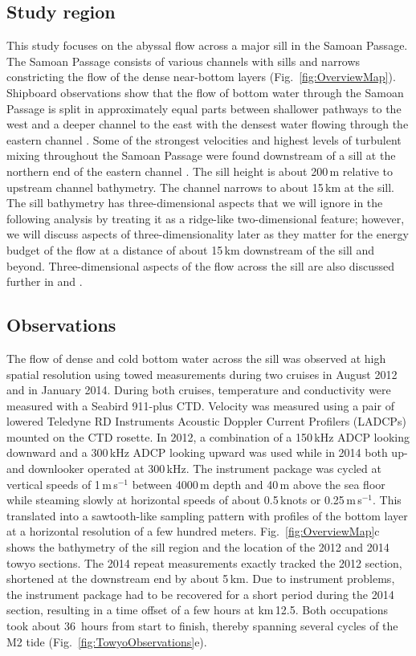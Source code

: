 \documentclass{ametsocV6.1}
\begin{document}
\subsection{Study region}\label{sec:StudyRegion}
This study focuses on the abyssal flow across a major sill in the Samoan Passage.
The Samoan Passage consists of various channels with sills and narrows constricting the flow of the dense near-bottom layers (Fig.~\ref{fig:OverviewMap}).
Shipboard observations show that the flow of bottom water through the Samoan Passage is split in approximately equal parts between shallower pathways to the west and a deeper channel to the east with the densest water flowing through the eastern channel \citep{voetetal15}.
Some of the strongest velocities and highest levels of turbulent mixing throughout the Samoan Passage were found downstream of a sill at the northern end of the eastern channel \citep{alfordetal13c}.
The sill height is about 200\,m relative to upstream channel bathymetry.
The channel narrows to about 15\,km at the sill.
The sill bathymetry has three-dimensional aspects that we will ignore in the following analysis by treating it as a ridge-like two-dimensional feature; however, we will discuss aspects of three-dimensionality later as they matter for the energy budget of the flow at a distance of about 15\,km downstream of the sill and beyond.
Three-dimensional aspects of the flow across the sill are also discussed further in \citet{girtonetal19} and \citet{cusacketal21}.


\subsection{Observations}\label{sec:Observations}
The flow of dense and cold bottom water across the sill was observed at high spatial resolution using towed measurements during two cruises in August 2012 and in January 2014.
During both cruises, temperature and conductivity were measured with a Seabird 911-plus CTD.
Velocity was measured using a pair of lowered Teledyne RD Instruments Acoustic Doppler Current Profilers (LADCPs) mounted on the CTD rosette.
In 2012, a combination of a 150\,kHz ADCP looking downward and a 300\,kHz ADCP looking upward was used while in 2014 both up- and downlooker operated at 300\,kHz.
The instrument package was cycled at vertical speeds of 1\,m\,s$^{-1}$ between 4000\,m depth and 40\,m above the sea floor while steaming slowly at horizontal speeds of about 0.5\,knots or 0.25\,m\,s$^{-1}$.
This translated into a sawtooth-like sampling pattern with profiles of the bottom layer at a horizontal resolution of a few hundred meters.
Fig.~\ref{fig:OverviewMap}c shows the bathymetry of the sill region and the location of the 2012 and 2014 towyo sections.
The 2014 repeat measurements exactly tracked the 2012 section, shortened at the downstream end by about 5\,km.
Due to instrument problems, the instrument package had to be recovered for a short period during the 2014 section, resulting in a time offset of a few hours at km\,12.5.
Both occupations took about 36~hours from start to finish, thereby spanning several cycles of the M2 tide (Fig.~\ref{fig:TowyoObservations}e).
\end{document}
